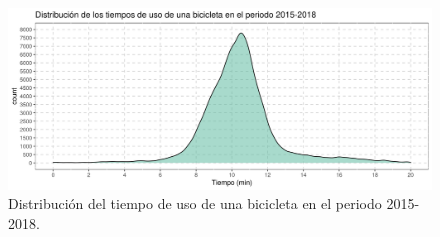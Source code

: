 \begin{figure}[H]
    \centering
    \includegraphics[width=16cm]{Graphics/distribution_time_travel.png}
    \caption{Distribución del tiempo de uso de una bicicleta en el periodo 2015-2018.}
    \label{fig:distribution_times}
\end{figure}